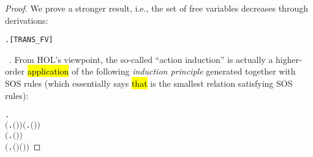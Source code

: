 \begin{proof}
We  prove a stronger result,
i.e.,  the set of free variables decreases through derivations:
\begin{alltt}
\HOLTokenTurnstile{} \HOLSymConst{\HOLTokenForall{}}  .  \HOLTokenTransBegin{}\HOLTokenTransEnd {} \HOLSymConst{\HOLTokenImp{}}   \HOLSymConst{\HOLTokenSubset{}}  \hfill{[TRANS_FV]}
\end{alltt}

~\cite{milner1990operational}.
From HOL's viewpoint, the so-called ``action induction'' is actually a higher-order \hl{application}
of the following \emph{induction principle} generated together with SOS
rules (which essentially says \hl{that}  is the smallest relation
satisfying SOS rules):
\begin{alltt}
\HOLTokenTurnstile{} \HOLSymConst{\HOLTokenForall{}}.
       \ensuremath{(}\HOLSymConst{\HOLTokenForall{}} .  \ensuremath{(}\HOLSymConst{\ensuremath{\ldotp}}\ensuremath{)}  \ensuremath{)} \HOLSymConst{\HOLTokenConj{}} \ensuremath{(}\HOLSymConst{\HOLTokenForall{}}   .     \HOLSymConst{\HOLTokenImp{}}  \ensuremath{(} \HOLSymConst{\ensuremath{+}} \ensuremath{)}  \ensuremath{)} \HOLSymConst{\HOLTokenConj{}}
       \ensuremath{(}\HOLSymConst{\HOLTokenForall{}}   .     \HOLSymConst{\HOLTokenImp{}}  \ensuremath{(} \HOLSymConst{\ensuremath{+}} \ensuremath{)}  \ensuremath{)} \HOLSymConst{\HOLTokenConj{}}
       \ensuremath{(}\HOLSymConst{\HOLTokenForall{}}   .     \HOLSymConst{\HOLTokenImp{}}  \ensuremath{(} \HOLSymConst{\ensuremath{\mid}} \ensuremath{)}  \ensuremath{(} \HOLSymConst{\ensuremath{\mid}} \ensuremath{)}\ensuremath{)} \HOLSymConst{\HOLTokenConj{}}

\end{alltt}
\end{proof}
